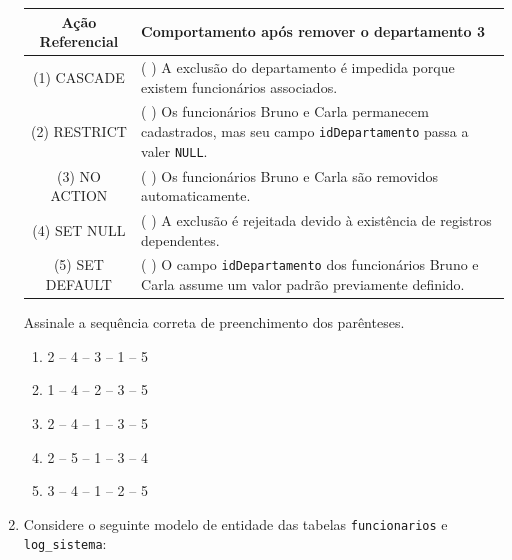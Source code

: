 \documentclass[12pt,a4paper]{article}
\begin{document}
\begin{enumerate}
\begin{center}
\begin{tabular}{|c|p{8cm}|}
\hline
\textbf{Ação Referencial} & \textbf{Comportamento após remover o departamento 3} \\
\hline
(1) CASCADE & ( \hspace{0.3cm} ) A exclusão do departamento é impedida porque existem funcionários associados. \\
\hline
(2) RESTRICT & ( \hspace{0.3cm} ) Os funcionários Bruno e Carla permanecem cadastrados, mas seu campo \texttt{idDepartamento} passa a valer \texttt{NULL}. \\
\hline
(3) NO ACTION & ( \hspace{0.3cm} ) Os funcionários Bruno e Carla são removidos automaticamente. \\
\hline
(4) SET NULL & ( \hspace{0.3cm} ) A exclusão é rejeitada devido à existência de registros dependentes. \\
\hline
(5) SET DEFAULT & ( \hspace{0.3cm} ) O campo \texttt{idDepartamento} dos funcionários Bruno e Carla assume um valor padrão previamente definido. \\
\hline
\end{tabular}
\end{center}

Assinale a sequência correta de preenchimento dos parênteses.

\begin{enumerate}[label=\alph*)]
    \item 2 -- 4 -- 3 -- 1 -- 5
    \item 1 -- 4 -- 2 -- 3 -- 5
    \item 2 -- 4 -- 1 -- 3 -- 5
\item 2 -- 5 -- 1 -- 3 -- 4
\item 3 -- 4 -- 1 -- 2 -- 5
\end{enumerate}

    \vspace{0.5cm}

    \item  Considere o seguinte modelo de entidade das tabelas \texttt{funcionarios} e \texttt{log\_sistema}:
    
    \vspace{0.3cm}
    \begin{center}
\end{center}
\end{enumerate}
\end{document}
